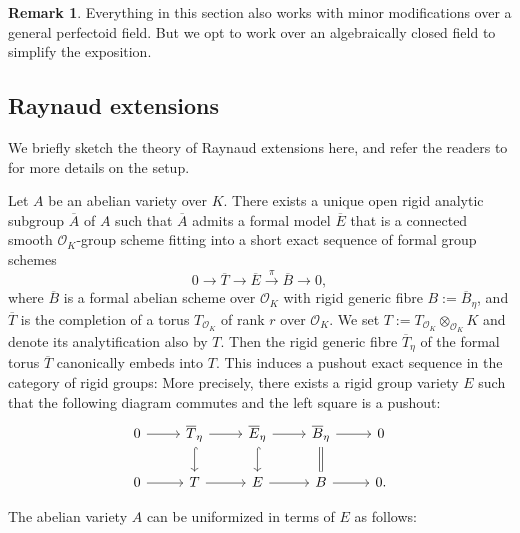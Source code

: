 \documentclass[10pt,oneside]{amsart}
\theoremstyle{definition}
\newtheorem{remark}[theorem]{Remark}
\begin{document}
	
	\begin{remark}\label{Remark on dealing with general perfectoid fields by Galois descent}
		Everything in this section also works with minor modifications over a general perfectoid field. But we opt to work over an algebraically closed field to simplify the exposition.
	\end{remark}
	
	
	\subsection{Raynaud extensions}
	
        We briefly sketch the theory of Raynaud extensions here, and refer the readers to \cite{Bosch-Lut, Lut-survey, Lut} for more details on the setup.

	Let $A$ be an abelian variety over $K$. There exists a unique open rigid analytic subgroup $\overline A$ of $A$ such that $\overline A$ admits a formal model $\overline E$ that is a connected smooth $\mathcal O_K$-group scheme fitting into a short exact sequence of formal group schemes
	\begin{equation}\label{formal Raynaud extension}
	0\rightarrow \overline T \rightarrow \overline E \xrightarrow{\pi} \overline{B}\rightarrow 0,
	\end{equation}
	where $\overline{B}$ is a formal abelian scheme over $\mathcal O_K$ with rigid generic fibre $B:=\overline{B}_\eta$, and $\overline{T}$ is the completion of a torus $T_{\mathcal O_K}$ of rank $r$ over $\mathcal O_K$.
	We set $T:=T_{\mathcal O_K}\otimes_{\mathcal O_K}K$ and denote its analytification also by $T$. Then the rigid generic fibre $\overline{T}_\eta$ of the formal torus $\overline{T}$ canonically embeds into $T$. This induces a pushout exact sequence in the category of rigid groups: More precisely, there exists a rigid group variety $E$ such that the following diagram commutes and the left square is a pushout:
		\begin{equation}\label{Raynaud diagram}
		\begin{tikzcd}
			0 \arrow[r] & \overline{T}_\eta \arrow[d, hook] \arrow[r] & \overline{E}_\eta \arrow[d, hook] \arrow[r] & \overline{B}_\eta \arrow[d,equal] \arrow[r] & 0 \\
			0 \arrow[r] & T \arrow[r] & E \arrow[r] & B \arrow[r] & 0.
		\end{tikzcd}
		\end{equation}
	
	The abelian variety $A$ can be uniformized in terms of $E$ as follows:
	
\end{document}
